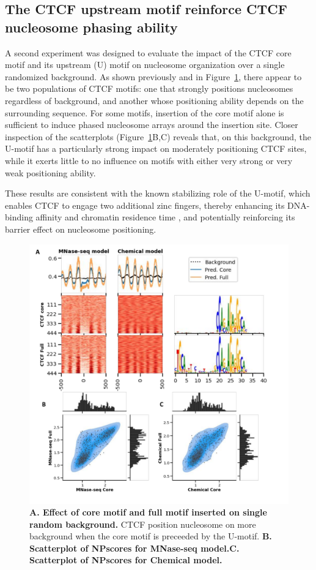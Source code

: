\documentclass[11pt]{book}
\begin{document}
\FloatBarrier
\subsection{The CTCF upstream motif reinforce CTCF nucleosome phasing ability}
A second experiment was designed to evaluate the impact of the CTCF core motif and its upstream (U) motif on nucleosome organization over a single randomized background. As shown previously and in Figure~\ref{fig:umotif_insertion}, there appear to be two populations of CTCF motifs: one that strongly positions nucleosomes regardless of background, and another whose positioning ability depends on the surrounding sequence. For some motifs, insertion of the core motif alone is sufficient to induce phased nucleosome arrays around the insertion site. Closer inspection of the scatterplots (Figure~\ref{fig:umotif_insertion}B,C) reveals that, on this background, the U-motif has a particularly strong impact on moderately positioning CTCF sites, while it exerts little to no influence on motifs with either very strong or very weak positioning ability.

These results are consistent with the known stabilizing role of the U-motif, which enables CTCF to engage two additional zinc fingers, thereby enhancing its DNA-binding affinity and chromatin residence time \cite{nakahashi_genome-wide_2013}, and potentially reinforcing its barrier effect on nucleosome positioning.

\begin{figure}[htbp]
\centering
    \includegraphics[width=\textwidth]{Figures/Results/NAtctcfFullCore_onBg.pdf}
    \caption{\textbf{A. Effect of core motif and full motif inserted on single random background.} CTCF position nucleosome on more background when the core motif is preceeded by the U-motif. \textbf{B. Scatterplot of NPscores for MNase-seq model.}\textbf{C. Scatterplot of NPscores for Chemical model.}}
    \label{fig:umotif_insertion}
\end{figure}
\end{document}

